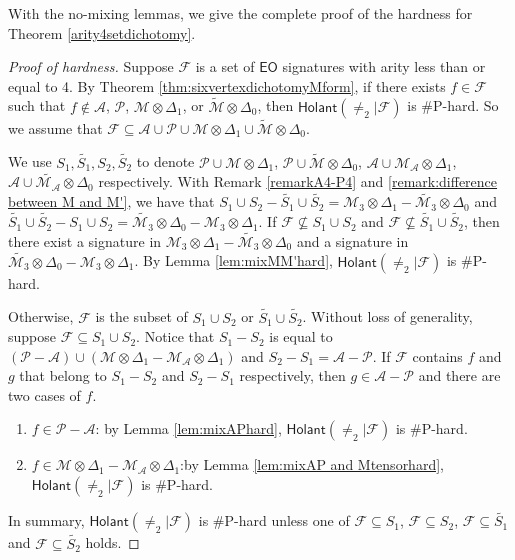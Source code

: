 \documentclass[a4paper,UKenglish,cleveref, autoref, thm-restate]{lipics-v2021}
\newcommand{\hol}[0]{\textsf{Holant}}
\newcommand{\eo}[0]{\textsf{EO}}
\begin{document}
With the no-mixing lemmas, we give the complete proof of the hardness for Theorem \ref{arity4setdichotomy}.

\begin{proof}[Proof of hardness]
Suppose $\mathcal{F}$ is a set of $\eo$ signatures with arity less than or equal to 4. By Theorem \ref{thm:sixvertexdichotomyMform}, if there exists $f\in\mathcal{F}$ such that $f\notin\mathscr{A}$, $\mathscr{P}$, $\mathscr{M}\otimes\Delta_1$, or $\widetilde{\mathscr{M}}\otimes\Delta_0$, then $\hol(\neq_2|\mathcal{F})$ is \#P-hard. So we assume that $\mathcal{F}\subseteq\mathscr{A}\cup\mathscr{P}\cup\mathscr{M}\otimes\Delta_1\cup\widetilde{\mathscr{M}}\otimes\Delta_0$.

We use $S_1,\widetilde{S_1},S_2,\widetilde{S_2}$ to denote $\mathscr{P}\cup\mathscr{M}\otimes\Delta_1$, $\mathscr{P}\cup\widetilde{\mathscr{M}}\otimes\Delta_0$, $\mathscr{A}\cup\mathscr{M}_{\mathscr{A}}\otimes\Delta_1$, $\mathscr{A}\cup\widetilde{\mathscr{M}_{\mathscr{A}}}\otimes\Delta_0$ respectively. With Remark \ref{remarkA4-P4} and \ref{remark:difference between M and M'}, we have that $S_1\cup S_2-\widetilde{S_1}\cup \widetilde{S_2}=\mathscr{M}_3\otimes\Delta_1-\widetilde{\mathscr{M}_3}\otimes\Delta_0$ and $\widetilde{S_1}\cup \widetilde{S_2}-S_1\cup S_2=\widetilde{\mathscr{M}_3}\otimes\Delta_0-\mathscr{M}_3\otimes\Delta_1$. If $\mathcal{F}\not\subseteq S_1\cup S_2$ and $\mathcal{F}\not\subseteq \widetilde{S_1}\cup \widetilde{S_2}$, then there exist a signature in $\mathscr{M}_3\otimes\Delta_1-\widetilde{\mathscr{M}_3}\otimes\Delta_0$ and a signature in $\widetilde{\mathscr{M}_3}\otimes\Delta_0-\mathscr{M}_3\otimes\Delta_1$. By Lemma \ref{lem:mixMM'hard}, $\hol(\neq_2|\mathcal{F})$ is \#P-hard.

Otherwise, $\mathcal{F}$ is the subset of $S_1\cup S_2$ or $\widetilde{S_1}\cup \widetilde{S_2}$. Without loss of generality, suppose $\mathcal{F}\subseteq S_1\cup S_2$. Notice that $S_1-S_2$ is equal to $(\mathscr{P}-\mathscr{A})\cup(\mathscr{M}\otimes\Delta_1-\mathscr{M}_\mathscr{A}\otimes\Delta_1)$ and $S_2-S_1=\mathscr{A}-\mathscr{P}$. If $\mathcal{F}$ contains $f$ and $g$ that belong to $S_1-S_2$ and $S_2-S_1$ respectively, then $g\in\mathscr{A}-\mathscr{P}$ and there are two cases of $f$.

\begin{enumerate}
\item $f\in\mathscr{P}-\mathscr{A}$: by Lemma \ref{lem:mixAPhard}, $\hol(\neq_2|\mathcal{F})$ is \#P-hard.

\item $f\in\mathscr{M}\otimes\Delta_1-\mathscr{M}_\mathscr{A}\otimes\Delta_1$:by Lemma \ref{lem:mixAP and Mtensorhard}, $\hol(\neq_2|\mathcal{F})$ is \#P-hard.
\end{enumerate}

In summary, $\hol(\neq_2|\mathcal{F})$ is \#P-hard unless one of $\mathcal{F}\subseteq S_1$,  $\mathcal{F}\subseteq S_2$, $\mathcal{F}\subseteq \widetilde{S_1}$ and $\mathcal{F}\subseteq \widetilde{S_2}$ holds.
\end{proof}
\end{document}
